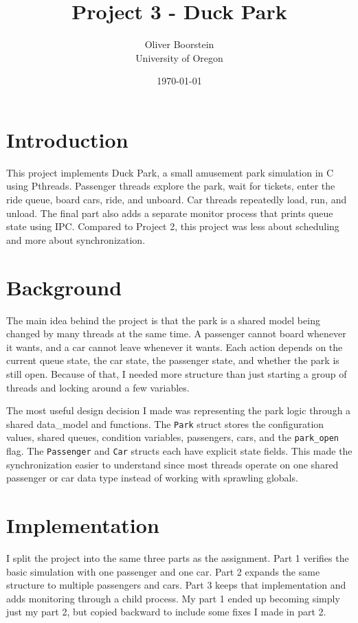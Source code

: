 \documentclass[12pt]{article}
\title{Project 3 - Duck Park}
\author{Oliver Boorstein \\ University of Oregon}
\date{\today}
\begin{document}
\maketitle
\pagebreak

\section{Introduction}
This project implements Duck Park, a small amusement park simulation in C using Pthreads. Passenger threads explore the park, wait for tickets, enter the ride queue, board cars, ride, and unboard. Car threads repeatedly load, run, and unload. The final part also adds a separate monitor process that prints queue state using IPC. Compared to Project 2, this project was less about scheduling and more about synchronization.

\section{Background}
The main idea behind the project is that the park is a shared model being changed by many threads at the same time. A passenger cannot board whenever it wants, and a car cannot leave whenever it wants. Each action depends on the current queue state, the car state, the passenger state, and whether the park is still open. Because of that, I needed more structure than just starting a group of threads and locking around a few variables.

The most useful design decision I made was representing the park logic through a shared data\_model and functions. The \lstinline[language=C]|Park| struct stores the configuration values, shared queues, condition variables, passengers, cars, and the \lstinline[language=C]|park_open| flag. The \lstinline[language=C]|Passenger| and \lstinline[language=C]|Car| structs each have explicit state fields. This made the synchronization easier to understand since most threads operate on one shared passenger or car data type instead of working with sprawling globals.

\section{Implementation}
I split the project into the same three parts as the assignment. Part 1 verifies the basic simulation with one passenger and one car. Part 2 expands the same structure to multiple passengers and cars. Part 3 keeps that implementation and adds monitoring through a child process. My part 1 ended up becoming simply just my part 2, but copied backward to include some fixes I made in part 2.
\end{document}
